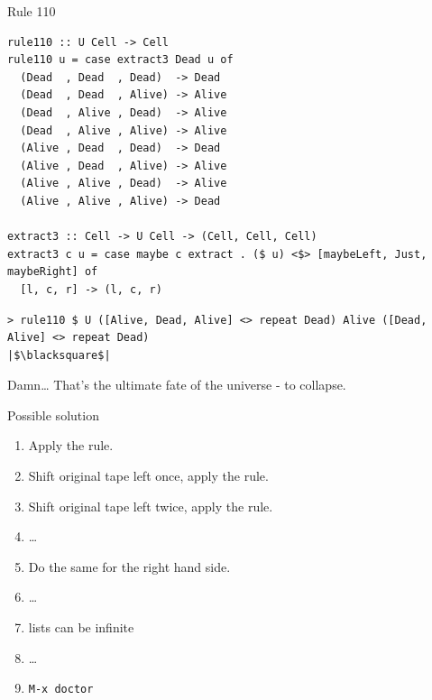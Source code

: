 \documentclass[presentation,aspectratio=169,smaller]{beamer}
\begin{document}
\begin{frame}[label={sec:orgf467f29},fragile]{Rule 110}
 \begin{verbatim}
rule110 :: U Cell -> Cell
rule110 u = case extract3 Dead u of
  (Dead  , Dead  , Dead)  -> Dead
  (Dead  , Dead  , Alive) -> Alive
  (Dead  , Alive , Dead)  -> Alive
  (Dead  , Alive , Alive) -> Alive
  (Alive , Dead  , Dead)  -> Dead
  (Alive , Dead  , Alive) -> Alive
  (Alive , Alive , Dead)  -> Alive
  (Alive , Alive , Alive) -> Dead

extract3 :: Cell -> U Cell -> (Cell, Cell, Cell)
extract3 c u = case maybe c extract . ($ u) <$> [maybeLeft, Just, maybeRight] of
  [l, c, r] -> (l, c, r)
\end{verbatim}

\pause

\begin{verbatim}
> rule110 $ U ([Alive, Dead, Alive] <> repeat Dead) Alive ([Dead, Alive] <> repeat Dead)
|$\blacksquare$|
\end{verbatim}

\pause

Damn\ldots{} That's the ultimate fate of the universe - to collapse.
\end{frame}

\begin{frame}[label={sec:orgf7d14f7},fragile]{Possible solution}
 \begin{enumerate}
\item <1-> Apply the rule.
\item <2-> Shift original tape left once, apply the rule.
\item <3-> Shift original tape left twice, apply the rule.
\item <4-> \ldots{}
\item <5-> Do the same for the right hand side.
\item <6-> \ldots{}
\item <7-> lists can be infinite
\item <8-> \ldots{}
\item <9-> \texttt{M-x doctor}
\end{enumerate}
\end{frame}
\end{document}
